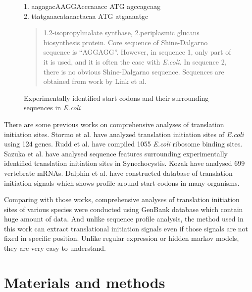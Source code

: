 \begin{figure}
\begin{tt}
\begin{center}
1. aagagacAAGGAcccaaacc ATG agccagcaag\\
2. ttatgaaacataaactacaa ATG atgaaaatgc
\end{center}
\end{tt}
\caption{Experimentally identified start codons and their surrounding sequences in {\it E.coli}}
\label{ex_start5}
\begin{quotation}
\begin{small}
1.2-isopropylmalate synthase, 2.periplasmic glucans biosynthesis
protein.  Core sequence of Shine-Dalgarno sequence is
``AGGAGG''. However, in sequence 1, only part of it is used, and it is
often the case with {\it E.coli}. In sequence 2, there is no obvious
Shine-Dalgarno sequence. Sequences are obtained from work by Link et al.\cite{lts14}
\end{small}
\end{quotation}
\end{figure}

There are some previous works on comprehensive analyses of translation
initiation sites. Stormo et al.\cite{arclabel5} have analyzed
translation initiation sites of {\it E.coli} using 124 genes. Rudd et
al.\cite{label659} have compiled 1055 {\it E.coli} ribosome binding
sites.  Sazuka et al.\cite{lsaz1,label515} have analysed sequence
features surrounding experimentally identified translation initiation
sites in Synechocystis. Kozak\cite{label3} have analysed 699
vertebrate mRNAs. Dalphin et al.\cite{mglabel11} have constructed
database of translation initiation signals which shows profile around
start codons in many organisms.

Comparing with those works, comprehensive analyses of translation
initiation sites of various species were conducted using GenBank
database which contain huge amount of data. And unlike sequence
profile analysis, the method used in this work can extract
translational initiation signals even if those signals are not fixed
in specific position. Unlike regular expression or hidden markov
models, they are very easy to understand.


\section{Materials and methods}

